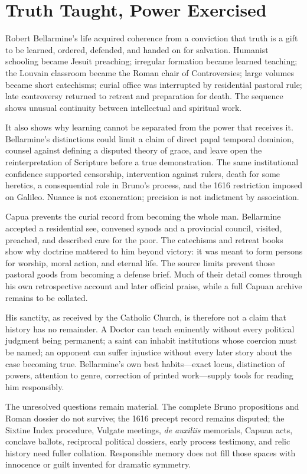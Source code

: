 \section{Truth Taught, Power Exercised}

Robert Bellarmine's life acquired coherence from a conviction that truth is a
gift to be learned, ordered, defended, and handed on for salvation.  Humanist
schooling became Jesuit preaching; irregular formation became learned
teaching; the Louvain classroom became the Roman chair of Controversies; large
volumes became short catechisms; curial office was interrupted by residential
pastoral rule; late controversy returned to retreat and preparation for death.
The sequence shows unusual continuity between intellectual and spiritual
work.

It also shows why learning cannot be separated from the power that receives
it.  Bellarmine's distinctions could limit a claim of direct papal temporal
dominion, counsel against defining a disputed theory of grace, and leave open
the reinterpretation of Scripture before a true demonstration.  The same
institutional confidence supported censorship, intervention against rulers,
death for some heretics, a consequential role in Bruno's process, and the 1616
restriction imposed on Galileo.  Nuance is not exoneration; precision is not
indictment by association.

Capua prevents the curial record from becoming the whole man.  Bellarmine
accepted a residential see, convened synods and a provincial council, visited,
preached, and described care for the poor.  The catechisms and retreat books
show why doctrine mattered to him beyond victory: it was meant to form persons
for worship, moral action, and eternal life.  The source limits prevent those
pastoral goods from becoming a defense brief.  Much of their detail comes
through his own retrospective account and later official praise, while a full
Capuan archive remains to be collated.

His sanctity, as received by the Catholic Church, is therefore not a claim that
history has no remainder.  A Doctor can teach eminently without every
political judgment being permanent; a saint can inhabit institutions whose
coercion must be named; an opponent can suffer injustice without every later
story about the case becoming true.  Bellarmine's own best habits---exact
locus, distinction of powers, attention to genre, correction of printed
work---supply tools for reading him responsibly.

The unresolved questions remain material.  The complete Bruno propositions
and Roman dossier do not survive; the 1616 precept record remains disputed;
the Sixtine Index procedure, Vulgate meetings, \emph{de auxiliis} memorials,
Capuan acts, conclave ballots, reciprocal political dossiers, early process
testimony, and relic history need fuller collation.  Responsible memory does
not fill those spaces with innocence or guilt invented for dramatic symmetry.

